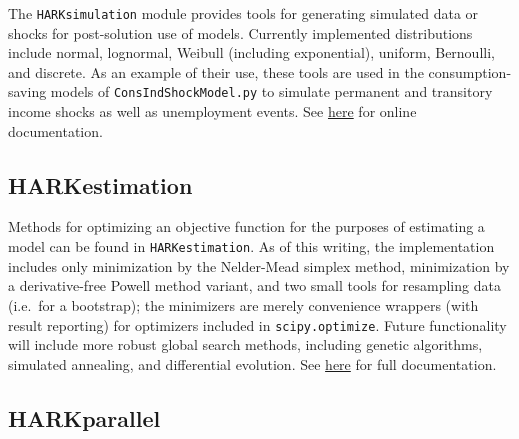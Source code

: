 \documentclass[12pt,titlepage,letterpaper]{econtex}
\begin{document}
The \texttt{HARKsimulation} module provides tools for generating simulated data or shocks for post-solution use of models.  Currently implemented distributions include normal, lognormal, Weibull (including exponential), uniform, Bernoulli, and discrete.  As an example of their use, these tools are used in the consumption-saving models of \texttt{ConsIndShockModel.py} to simulate permanent and transitory income shocks as well as unemployment events.  See \href{https://econ-ark.github.io/HARK/generated/HARKsimulation.html}{here} for online documentation.

\subsection{HARKestimation}\label{sec:HARKestimation}

Methods for optimizing an objective function for the purposes of estimating a model can be found in \texttt{HARKestimation}.  As of this writing, the implementation includes only minimization by the Nelder-Mead simplex method, minimization by a derivative-free Powell method variant, and two small tools for resampling data (i.e.\ for a bootstrap); the minimizers are merely convenience wrappers (with result reporting) for optimizers included in \texttt{scipy.optimize}.  Future functionality will include more robust global search methods, including genetic algorithms, simulated annealing, and differential evolution.  See \href{https://econ-ark.github.io/HARK/generated/HARKestimation.html}{here} for full documentation.

\subsection{HARKparallel}\label{sec:HARKparallel}
\end{document}
